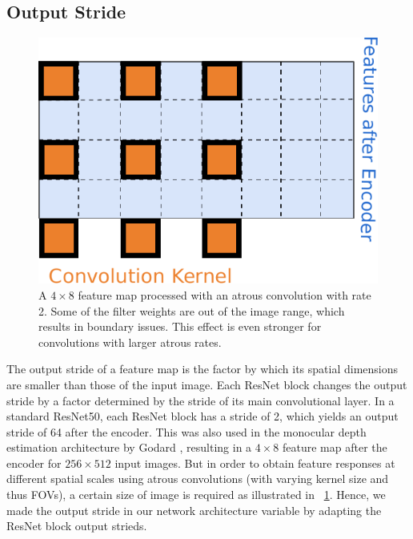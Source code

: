 \subsection{Output Stride}
\begin{figure}
    \centering
    \includegraphics[width=0.6\linewidth]{images/architecture/os64-atrous-conv-with-text.pdf}
    \caption{A $4 \times 8$ feature map processed with an atrous convolution with rate 2.
    Some of the filter weights are out of the image range, which results in boundary issues.
    This effect is even stronger for convolutions with larger atrous rates.}
    \label{fig:output-stride}
\end{figure}
The output stride of a feature map is the factor by which its spatial dimensions are smaller than those of the input image.
Each ResNet block changes the output stride by a factor determined by the stride of its main convolutional layer.
In a standard ResNet50, each ResNet block has a stride of 2, which yields an output stride of 64 after the encoder.
This was also used in the monocular depth estimation architecture by Godard \etal, resulting in a $4\times8$ feature map after the encoder for $256 \times 512$ input images.
But in order to obtain feature responses at different spatial scales using atrous convolutions (with varying kernel size and thus FOVs), a certain size of image is required as illustrated in \figurename~\ref{fig:output-stride}.
Hence, we made the output stride in our network architecture variable by adapting the ResNet block output strieds.

